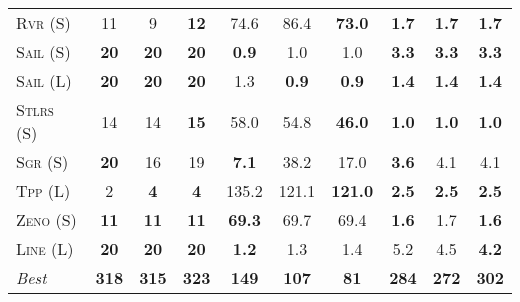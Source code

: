 \documentclass[11pt]{article}
\begin{document}
\begin{table*}[tb]
{\begin{tabular}{|l||ccc||ccc||ccc||}
\textsc{Rvr} (S)&11&9&\textbf{12}&74.6&86.4&\textbf{73.0}&\textbf{1.7}&\textbf{1.7}&\textbf{1.7}\\
\textsc{Sail} (S)&\textbf{20}&\textbf{20}&\textbf{20}&\textbf{0.9}&1.0&1.0&\textbf{3.3}&\textbf{3.3}&\textbf{3.3}\\
\textsc{Sail} (L)&\textbf{20}&\textbf{20}&\textbf{20}&1.3&\textbf{0.9}&\textbf{0.9}&\textbf{1.4}&\textbf{1.4}&\textbf{1.4}\\
\textsc{Stlrs} (S)&14&14&\textbf{15}&58.0&54.8&\textbf{46.0}&\textbf{1.0}&\textbf{1.0}&\textbf{1.0}\\
\textsc{Sgr} (S)&\textbf{20}&16&19&\textbf{7.1}&38.2&17.0&\textbf{3.6}&4.1&4.1\\
\textsc{Tpp} (L)&2&\textbf{4}&\textbf{4}&135.2&121.1&\textbf{121.0}&\textbf{2.5}&\textbf{2.5}&\textbf{2.5}\\
\textsc{Zeno} (S)&\textbf{11}&\textbf{11}&\textbf{11}&\textbf{69.3}&69.7&69.4&\textbf{1.6}&1.7&\textbf{1.6}\\
\textsc{Line} (L)&\textbf{20}&\textbf{20}&\textbf{20}&\textbf{1.2}&1.3&1.4&5.2&4.5&\textbf{4.2}
\\\hline
\textit{Best}&\textbf{318}&\textbf{315}&\textbf{323}&\textbf{149}&\textbf{107}&\textbf{81}&\textbf{284}&\textbf{272}&\textbf{302}\\\hline

        \end{tabular}}
        \caption{}
        \label{tab:all-patty}
        \end{table*}
        
\end{document}
